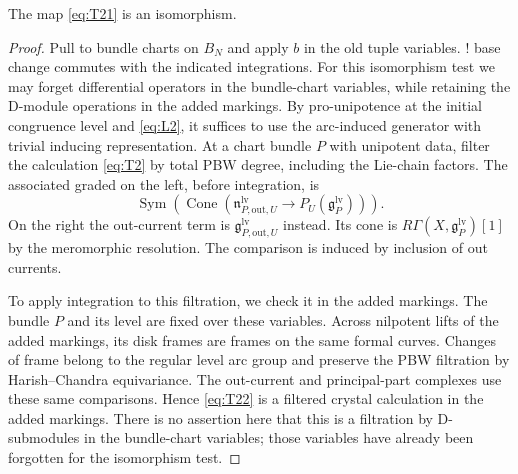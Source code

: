 \begin{lemma}\label{lem:ran-restriction-localization}
The map \eqref{eq:T21} is an isomorphism.
\end{lemma}

\begin{proof}
Pull to bundle charts on $B_N$ and apply $b$ in the old tuple
variables.  ! base change commutes with the indicated integrations.  For this
isomorphism test we may forget differential operators in the bundle-chart
variables, while retaining the D-module operations in the added markings.
By pro-unipotence at the initial congruence level and \eqref{eq:L2}, it
suffices to use the arc-induced generator with trivial inducing
representation.  At a chart bundle $P$ with unipotent data, filter the
calculation \eqref{eq:T2} by total PBW degree, including the Lie-chain
factors.  The associated graded on the left, before integration, is
\begin{equation}\label{eq:T22}
 \operatorname{Sym}\!\left(
   \operatorname{Cone}\!\left(
       \mathfrak n^{\mathrm{lv}}_{P,\mathrm{out},U}
          \longrightarrow P_U(\mathfrak g^{\mathrm{lv}}_P)
                         \right)\right).
\end{equation}
On the right the out-current term is
$\mathfrak g^{\mathrm{lv}}_{P,\mathrm{out},U}$ instead.  Its cone is
$R\Gamma(X,\mathfrak g^{\mathrm{lv}}_P)[1]$ by the meromorphic resolution.
The comparison is induced by inclusion of out currents.

To apply integration to this filtration, we check it in the added
markings.  The bundle $P$ and its level are fixed over these variables.
Across nilpotent lifts of the added markings, its disk frames are frames
on the same formal curves.  Changes of frame belong to the regular level
arc group and preserve the PBW filtration by Harish--Chandra equivariance.
The out-current and principal-part complexes use these same comparisons.
Hence \eqref{eq:T22} is a filtered crystal calculation in the added
markings.  There is no assertion here that this is a filtration by
D-submodules in the bundle-chart variables; those variables have already
been forgotten for the isomorphism test.


\end{proof}
